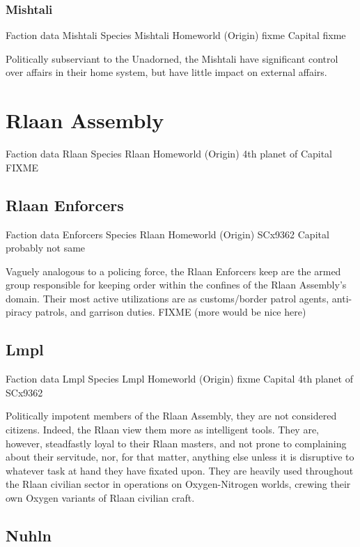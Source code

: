 \subsubsection{Mishtali}

Faction data 
Mishtali 
Species 	Mishtali 
Homeworld (Origin) 	fixme 
Capital 	fixme 

Politically subserviant to the Unadorned, the Mishtali have
significant control over affairs in their home system, but have little
impact on external affairs.

\section{Rlaan Assembly}

Faction data 
Rlaan 
Species 	Rlaan 
Homeworld (Origin) 	4th planet of 
Capital 	
FIXME 
 
\subsection{Rlaan Enforcers}

Faction data 
Enforcers 
Species 	Rlaan 
Homeworld (Origin) 	SCx9362 
Capital 	probably not same 

Vaguely analogous to a policing force, the Rlaan Enforcers keep are
the armed group responsible for keeping order within the confines of
the Rlaan Assembly's domain. Their most active utilizations are as
customs/border patrol agents, anti-piracy patrols, and garrison
duties.  FIXME (more would be nice here)
 
\subsection{Lmpl}

Faction data 
Lmpl 
Species 	Lmpl 
Homeworld (Origin) 	fixme 
Capital 	4th planet of SCx9362 

Politically impotent members of the Rlaan Assembly, they are not
considered citizens. Indeed, the Rlaan view them more as intelligent
tools. They are, however, steadfastly loyal to their Rlaan masters,
and not prone to complaining about their servitude, nor, for that
matter, anything else unless it is disruptive to whatever task at hand
they have fixated upon. They are heavily used throughout the Rlaan
civilian sector in operations on Oxygen-Nitrogen worlds, crewing their
own Oxygen variants of Rlaan civilian craft.
 
\subsection{Nuhln}


